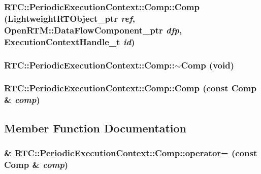 \subsubsection[{Comp}]{\setlength{\rightskip}{0pt plus 5cm}RTC::PeriodicExecutionContext::Comp::Comp (LightweightRTObject\_\-ptr {\em ref}, \/  OpenRTM::DataFlowComponent\_\-ptr {\em dfp}, \/  ExecutionContextHandle\_\-t {\em id})\hspace{0.3cm}{\ttfamily  [inline]}}\label{structRTC_1_1PeriodicExecutionContext_1_1Comp_a9dc4712ecec7794a3523c8982f65ce93}
\subsubsection[{$\sim$Comp}]{\setlength{\rightskip}{0pt plus 5cm}RTC::PeriodicExecutionContext::Comp::$\sim$Comp (void)\hspace{0.3cm}{\ttfamily  [inline]}}\label{structRTC_1_1PeriodicExecutionContext_1_1Comp_aa480b2328ec2db51a2db87303f9ddcd5}
\subsubsection[{Comp}]{\setlength{\rightskip}{0pt plus 5cm}RTC::PeriodicExecutionContext::Comp::Comp (const {\bf Comp} \& {\em comp})\hspace{0.3cm}{\ttfamily  [inline]}}\label{structRTC_1_1PeriodicExecutionContext_1_1Comp_a70c27ad2df79cc3ae2409f2ceacc53ab}


\subsection{Member Function Documentation}
\subsubsection[{operator=}]{\& RTC::PeriodicExecutionContext::Comp::operator= (const {\bf Comp} \& {\em comp})\hspace{0.3cm}{\ttfamily  [inline]}}\label{structRTC_1_1PeriodicExecutionContext_1_1Comp_abfbf57719852f39dbcb81e1874330a75}


